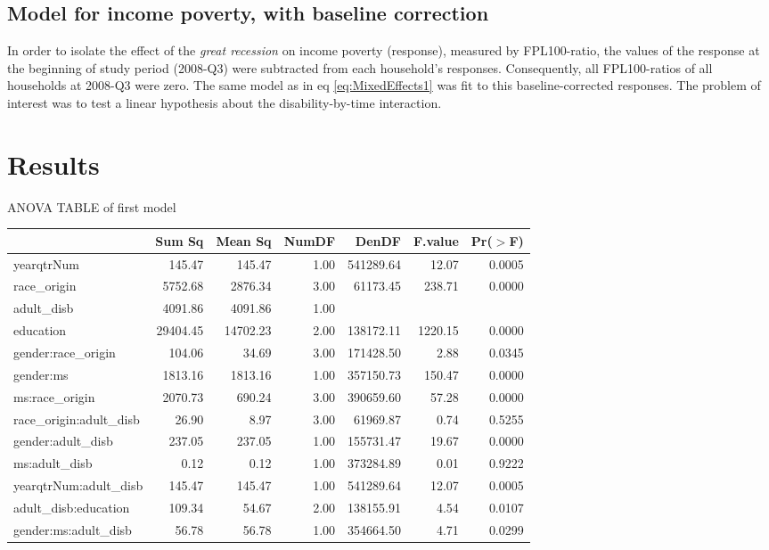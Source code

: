 \documentclass[11pt]{extarticle} %
\begin{document}
\subsection{Model for income poverty, with baseline correction}
In order to isolate the effect of the {\emph{great recession}} on income poverty (response), measured by FPL100-ratio, the values of the response at the beginning of study period (2008-Q3) were subtracted from each household's responses. Consequently, all FPL100-ratios of all households at 2008-Q3 were zero. The same model as in eq \ref{eq:MixedEffects1} was fit to this baseline-corrected responses. The problem of interest was to test a linear hypothesis about the disability-by-time interaction. 

\section{Results}
ANOVA TABLE of first model\\

\begin{table}[ht]
\footnotesize
\centering
\begin{tabular}{lrrrrrr}
  \hline
 & Sum Sq & Mean Sq & NumDF & DenDF & F.value & Pr($>$F) \\ 
  \hline
  yearqtrNum & 145.47 & 145.47 & 1.00 & 541289.64 & 12.07 & 0.0005 \\ 
  race\_origin & 5752.68 & 2876.34 & 3.00 & 61173.45 & 238.71 & 0.0000 \\ 
  adult\_disb & 4091.86 & 4091.86 & 1.00 &  &  &  \\ 
  education & 29404.45 & 14702.23 & 2.00 & 138172.11 & 1220.15 & 0.0000 \\ 
  gender:race\_origin & 104.06 & 34.69 & 3.00 & 171428.50 & 2.88 & 0.0345 \\ 
  gender:ms & 1813.16 & 1813.16 & 1.00 & 357150.73 & 150.47 & 0.0000 \\ 
  ms:race\_origin & 2070.73 & 690.24 & 3.00 & 390659.60 & 57.28 & 0.0000 \\ 
  race\_origin:adult\_disb & 26.90 & 8.97 & 3.00 & 61969.87 & 0.74 & 0.5255 \\ 
  gender:adult\_disb & 237.05 & 237.05 & 1.00 & 155731.47 & 19.67 & 0.0000 \\ 
  ms:adult\_disb & 0.12 & 0.12 & 1.00 & 373284.89 & 0.01 & 0.9222 \\ 
  yearqtrNum:adult\_disb & 145.47 & 145.47 & 1.00 & 541289.64 & 12.07 & 0.0005 \\ 
  adult\_disb:education & 109.34 & 54.67 & 2.00 & 138155.91 & 4.54 & 0.0107 \\ 
  gender:ms:adult\_disb & 56.78 & 56.78 & 1.00 & 354664.50 & 4.71 & 0.0299 \\ 
   \hline
\end{tabular}
\end{table}
\end{document}
